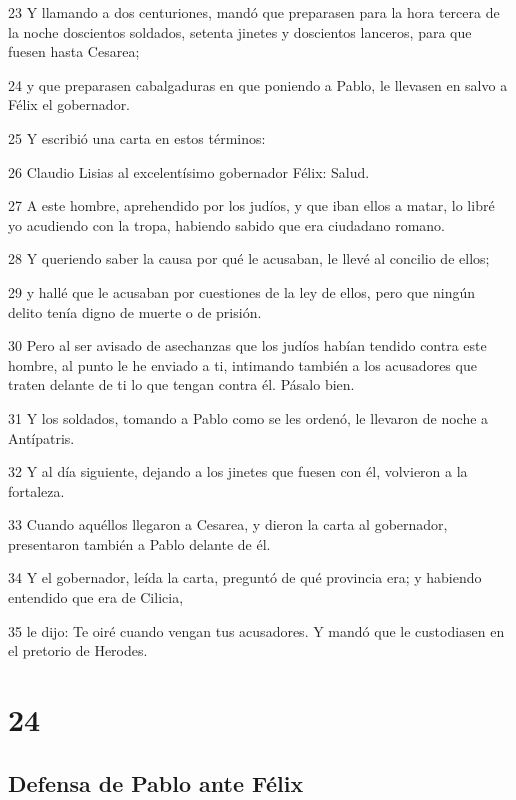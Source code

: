 \par 23 Y llamando a dos centuriones, mandó que preparasen para la hora tercera de la noche doscientos soldados, setenta jinetes y doscientos lanceros, para que fuesen hasta Cesarea;
\par 24 y que preparasen cabalgaduras en que poniendo a Pablo, le llevasen en salvo a Félix el gobernador.
\par 25 Y escribió una carta en estos términos:
\par 26 Claudio Lisias al excelentísimo gobernador Félix: Salud.
\par 27 A este hombre, aprehendido por los judíos, y que iban ellos a matar, lo libré yo acudiendo con la tropa, habiendo sabido que era ciudadano romano.
\par 28 Y queriendo saber la causa por qué le acusaban, le llevé al concilio de ellos;
\par 29 y hallé que le acusaban por cuestiones de la ley de ellos, pero que ningún delito tenía digno de muerte o de prisión.
\par 30 Pero al ser avisado de asechanzas que los judíos habían tendido contra este hombre, al punto le he enviado a ti, intimando también a los acusadores que traten delante de ti lo que tengan contra él. Pásalo bien.
\par 31 Y los soldados, tomando a Pablo como se les ordenó, le llevaron de noche a Antípatris.
\par 32 Y al día siguiente, dejando a los jinetes que fuesen con él, volvieron a la fortaleza.
\par 33 Cuando aquéllos llegaron a Cesarea, y dieron la carta al gobernador, presentaron también a Pablo delante de él.
\par 34 Y el gobernador, leída la carta, preguntó de qué provincia era; y habiendo entendido que era de Cilicia,
\par 35 le dijo: Te oiré cuando vengan tus acusadores. Y mandó que le custodiasen en el pretorio de Herodes.

\chapter{24}

\section*{Defensa de Pablo ante Félix}

